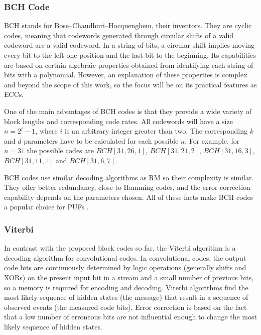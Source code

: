 \subsubsection{BCH Code}

BCH stands for Bose–Chaudhuri–Hocquenghem, their inventors. They are cyclic codes, meaning that codewords generated through circular shifts of a valid codeword are a valid codeword. In a string of bits, a circular shift implies moving every bit to the left one position and the last bit to the beginning. Its capabilities are based on certain algebraic properties obtained from identifying each string of bits with a polynomial. However, an explanation of these properties is complex and beyond the scope of this work, so the focus will be on its practical features as ECCs. 

One of the main advantages of BCH codes is that they provide a wide variety of block lengths and corresponding code rates. All codewords will have a size $n=2^i-1$, where $i$ is an arbitrary integer greater than two. The corresponding $k$ and $d$ parameters have to be calculated for each possible $n$. For example, for $n=31$ the possible codes are $BCH[31,26,1]$, $BCH[31,21,2]$, $BCH[31,16,3]$, $BCH[31,11,1]$ and $BCH[31,6,7]$. 

BCH codes use similar decoding algorithms as RM \cite{Guruswami2010} so their complexity is similar. They offer better redundancy, close to Hamming codes, and the error correction capability depends on the parameters chosen. All of these facts make BCH codes a popular choice for PUFs \cite{Delvaux2015,Bosch2008,Maes2012pufky}. 

\subsubsection{Viterbi}

In contrast with the proposed block codes so far, the Viterbi algorithm is a decoding algorithm for convolutional codes. In convolutional codes, the output code bits are continuously determined by logic operations (generally shifts and XORs) on the present input bit in a stream and a small number of previous bits, so a memory is required for encoding and decoding. Viterbi algorithms find the most likely sequence of hidden states (the message) that result in a sequence of observed events (the measured code bits). Error correction is based on the fact that a low number of erroneous bits are not influential enough to change the most likely sequence of hidden states.

